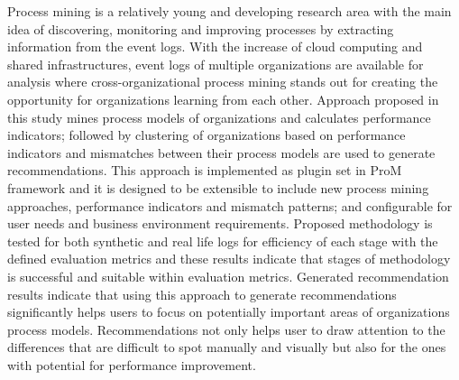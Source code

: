 Process mining is a relatively young and developing research area with the main idea of discovering, monitoring and improving processes by extracting information from the event logs. With the increase of cloud computing and shared infrastructures, event logs of multiple organizations are available for analysis where cross-organizational process mining stands out for creating the opportunity for organizations learning from each other. Approach proposed in this study mines process models of organizations and calculates performance indicators; followed by clustering of organizations based on performance indicators and mismatches between their process models are used to generate recommendations. This approach is implemented as plugin set in ProM framework and it is designed to be extensible to include new process mining approaches, performance indicators and mismatch patterns; and configurable for user needs and business environment requirements. Proposed methodology is tested for both synthetic and real life logs for efficiency of each stage with the defined evaluation metrics and these results indicate that stages of methodology is successful and suitable within evaluation metrics. Generated recommendation results indicate that using this approach to generate recommendations significantly helps users to focus on potentially important areas of organizations process models. Recommendations not only helps user to draw attention to the differences that are difficult to spot manually and visually but also for the ones with potential for performance improvement.  
